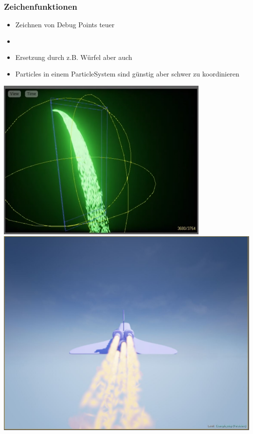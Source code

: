 \documentclass[18pt]{beamer}
\begin{document}
\begin{frame}
	\frametitle{Zeichenfunktionen} 
	\begin{itemize}
		\item Zeichnen von Debug Points teuer
		\item {}
		\item Ersetzung durch z.B. Würfel aber auch
		\item Particles in einem ParticleSystem sind günstig aber schwer zu koordinieren
	\end{itemize}
	\begin{center}
		\includegraphics[height=0.4\paperheight]{img/Particle_Systems2}
		\includegraphics[height=0.4\paperheight]{img/shuttle}
	\end{center}
\end{frame}
\end{document}
